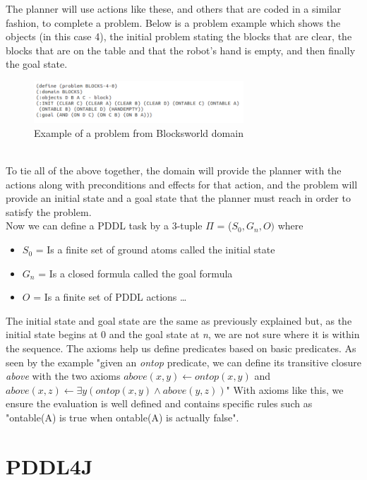 The planner will use actions like these, and others that are coded in a similar fashion, to complete a problem. Below is a problem example which shows the objects (in this case 4), the initial problem stating the blocks that are clear, the blocks that are on the table and that the robot's hand is empty, and then finally the goal state. 
\begin{figure}[!htb]
    \centering
    \includegraphics[scale=2.0,width=0.70\textwidth]{BlocksworldProblem.png}
    \caption{Example of a problem from Blocksworld 
    domain}
    \label{fig:Blocksworld Problem}
\end{figure}
\\
To tie all of the above together, the domain will provide the planner with the actions along with preconditions and effects for that action, and the problem will provide an initial state and a goal state that the planner must reach in order to satisfy the problem. 
\\
Now we can define a PDDL task by a 3-tuple $\Pi$ = ($S_0, G_n, O)$ where
\begin{itemize}
\item $S_0$ = Is a finite set of ground atoms called the initial state
\item $G_n$ = Is a closed formula called the goal formula
\item $O$ = Is a finite set of PDDL actions \cite{ConciseDomain} \ldots
\end{itemize} 

The initial state and goal state are the same as previously explained but, as the initial state begins at 0 and the goal state at \textit{n}, we are not sure where it is within the sequence. The axioms help us define predicates based on basic predicates. As seen by the example "given an \textit{ontop} predicate, we can define its transitive closure \textit{above} with the two axioms \textit{$above(x,y) \leftarrow ontop(x,y)$} and \textit{$above(x,z) \leftarrow \exists y(ontop(x,y)\wedge above(y,z))$}" \cite{ConciseDomain} With axioms like this, we ensure the evaluation is well defined and contains specific rules such as "ontable(A) is true when ontable(A) is actually false".   

\section{PDDL4J}

